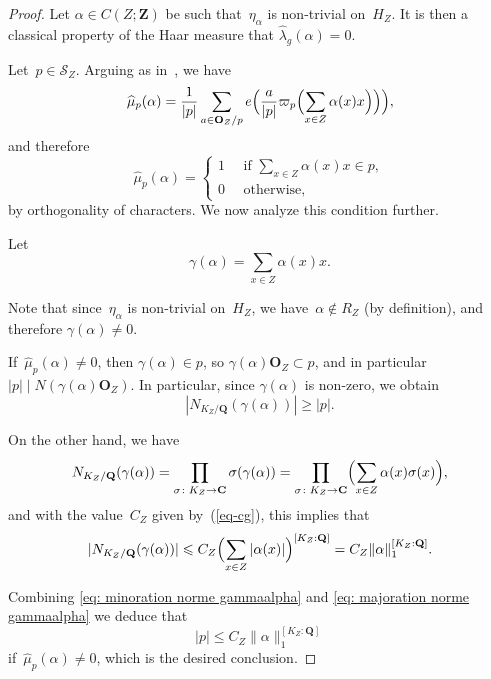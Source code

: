 \documentclass[12pt]{amsart}
\renewcommand{\mathcal}{\mathscr}
\renewcommand{\leq}{\leqslant}
\newcommand{\Cc}{\mathbf{C}}
\newcommand{\Oo}{\mathbf{O}}
\newcommand{\Zz}{\mathbf{Z}}
\newcommand{\Qq}{\mathbf{Q}}
\renewcommand{\hat}{\widehat}
\theoremstyle{plain}
\theoremstyle{remark}
\theoremstyle{definition}
\newcommand{\mcS}{\mathcal{S}}
\renewcommand{\leq}{\leqslant}
\begin{document}
\begin{proof}
  Let $\alpha \in C(Z; \Zz)$ be such that~$\eta_{\alpha}$ is non-trivial
  on~$H_Z$. It is then a classical property of the Haar measure that
  $\widehat{\lambda}_g(\alpha)=0$.

  Let~$p\in \mcS_Z$. Arguing as in~\cite[Prop.\,2.2]{ultrashort}, we
  have
  \[
    \widehat{\mu}_p(\alpha)=
    \frac{1}{|p|}\sum_{a\in\Oo_Z/p}e\Bigl(
    \frac{a}{|p|}\varpi_p\Bigl(\sum_{x\in Z}\alpha(x)x\Bigr)\Bigr)
    \Bigr),
  \]
  and therefore
  $$
  \hat{\mu}_p(\alpha) = \begin{cases}
    1 \quad \text{ if } \sum_{x\in Z}\alpha(x)x \in p, \\
    0 \quad \text{ otherwise, }
  \end{cases}
  $$
  by orthogonality of characters. We now analyze this condition
  further.

  Let
  \[
    \gamma(\alpha)=\sum_{x\in Z}\alpha(x)x.
  \]

  Note that since~$\eta_{\alpha}$ is non-trivial on~$H_Z$, we
  have~$\alpha\notin R_Z$ (by definition), and therefore
  $\gamma(\alpha)\not=0$.

  If~$\widehat{\mu}_p(\alpha)\not=0$, then $\gamma(\alpha) \in p$, so
  $\gamma(\alpha) \Oo_Z\subset p$, and in particular
  $|p|\mid N(\gamma(\alpha)\Oo_Z)$.  In particular, since
  $\gamma(\alpha)$ is non-zero, we obtain
  \begin{equation} \label{eq: minoration norme gammaalpha}
    |N_{K_Z/\Qq}(\gamma(\alpha))| \geqslant |p|.
  \end{equation}
  
  On the other hand, we have
  \[
    N_{K_Z/\Qq}(\gamma(\alpha))= \prod_{\sigma \colon K_Z\to\Cc}
    \sigma(\gamma(\alpha)) = \prod_{\sigma \colon K_Z\to \Cc} \Bigl(
  \sum_{x\in Z}^{} \alpha(x)\sigma(x) \Bigr),
  \]
  and with the value~$C_Z$ given by~(\ref{eq-cg}), this implies that
  \begin{equation}\label{eq: majoration norme gammaalpha}
    |N_{K_Z/\Qq}(\gamma(\alpha))| \leqslant C_Z \Bigl( \sum_{x \in
      Z}|\alpha(x) |\Bigr)^{[K_Z:\Qq]} = C_Z \| \alpha \|_1^{[K_Z: \Qq]}.
  \end{equation}
  
  Combining \eqref{eq: minoration norme gammaalpha} and \eqref{eq:
    majoration norme gammaalpha} we deduce that
  \[
    |p| \leq C_Z  \| \alpha \|_1^{[K_Z: \Qq]}
  \]
  if~$\widehat{\mu}_p(\alpha)\not=0$, which is the desired conclusion.
\end{proof}
\end{document}
